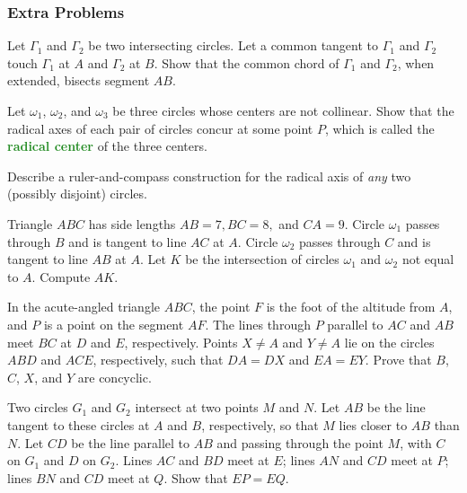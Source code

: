 \documentclass{scrartcl}
\providecommand{\vocab}[1]{{\textbf{\textcolor{ForestGreen}{#1}}}}
\begin{document}
\subsubsection{Extra Problems}

\begin{problem}
	Let $\Gamma_1$ and $\Gamma_2$ be two intersecting circles.
	Let a common tangent to $\Gamma_1$ and $\Gamma_2$ touch
	$\Gamma_1$ at $A$ and $\Gamma_2$ at $B$.
	Show that the common chord of $\Gamma_1$ and $\Gamma_2$, when extended,
	bisects segment $AB$.
\end{problem}

\begin{problem}
	Let $\omega_1$, $\omega_2$, and $\omega_3$ be three circles
	whose centers are not collinear. Show that the radical axes
	of each pair of circles concur at some point $P$,
	which is called the \vocab{radical center} of the three centers.
\end{problem}

\begin{problem}
	Describe a ruler-and-compass construction for the radical axis
	of \emph{any} two (possibly disjoint) circles.
\end{problem}

\begin{problem}[2019 AIME II/11]
	Triangle $ABC$ has side lengths $AB=7, BC=8,$ and $CA=9.$
	Circle $\omega_1$ passes through $B$ and is tangent to line $AC$ at $A.$
	Circle $\omega_2$ passes through $C$ and is tangent to line $AB$ at $A.$
	Let $K$ be the intersection of circles $\omega_1$ and $\omega_2$
	not equal to $A.$ Compute $AK$.
\end{problem}

\begin{niceprob}[Shortlist 2022 G2]
	In the acute-angled triangle $ABC$, the point $F$ is the foot of the altitude
	from $A$, and $P$ is a point on the segment $AF$. The lines through $P$ parallel
	to $AC$ and $AB$ meet $BC$ at $D$ and $E$, respectively. Points $X \ne A$ and $Y
	\ne A$ lie on the circles $ABD$ and $ACE$, respectively,
	such that $DA = DX$ and $EA = EY$.
	Prove that $B$, $C$, $X$, and $Y$ are concyclic.
\end{niceprob}

\begin{problem}[IMO 2000/1]
	Two circles $ G_1$ and $ G_2$ intersect at two points $ M$ and $ N$.
	Let $ AB$ be the line tangent to these circles at $ A$ and $ B$,
	respectively, so that $ M$ lies closer to $ AB$ than $ N$.
	Let $ CD$ be the line parallel to $ AB$ and passing through the point $ M$,
	with $ C$ on $ G_1$ and $ D$ on $ G_2$. Lines $ AC$ and $ BD$ meet at $ E$;
	lines $ AN$ and $ CD$ meet at $ P$; lines $ BN$ and $ CD$ meet at $ Q$.
	Show that $ EP = EQ$.
\end{problem}
\end{document}

